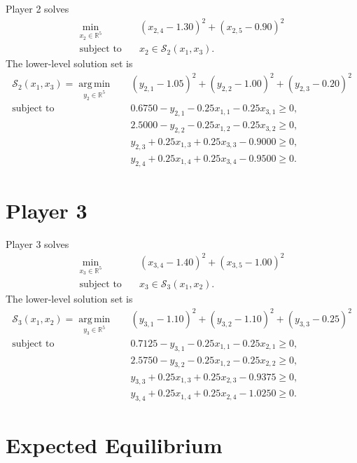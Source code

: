 \documentclass[11pt]{article}
\begin{document}
Player 2 solves
\[
\begin{aligned}
  \min_{x_2 \in \mathbb{R}^5}
  \quad &
    (x_{2,4}-1.30)^2 + (x_{2,5}-0.90)^2 \\
  \text{subject to}
  \quad &
    x_2 \in \mathcal{S}_2(x_1,x_3).
\end{aligned}
\]
The lower-level solution set is
\[
\begin{aligned}
  \mathcal{S}_2(x_1,x_3)
  =
  \operatorname*{arg\,min}_{y_2 \in \mathbb{R}^5}
  \quad &
    (y_{2,1}-1.05)^2
    +(y_{2,2}-1.00)^2
    +(y_{2,3}-0.20)^2\\
  \text{subject to}
  \quad &
    0.6750 - y_{2,1} - 0.25x_{1,1} - 0.25x_{3,1} \ge 0,\\
  &
    2.5000 - y_{2,2} - 0.25x_{1,2} - 0.25x_{3,2} \ge 0,\\
  &
    y_{2,3} + 0.25x_{1,3} + 0.25x_{3,3} - 0.9000 \ge 0,\\
  &
    y_{2,4} + 0.25x_{1,4} + 0.25x_{3,4} - 0.9500 \ge 0.
\end{aligned}
\]

\section*{Player 3}

Player 3 solves
\[
\begin{aligned}
  \min_{x_3 \in \mathbb{R}^5}
  \quad &
    (x_{3,4}-1.40)^2 + (x_{3,5}-1.00)^2 \\
  \text{subject to}
  \quad &
    x_3 \in \mathcal{S}_3(x_1,x_2).
\end{aligned}
\]
The lower-level solution set is
\[
\begin{aligned}
  \mathcal{S}_3(x_1,x_2)
  =
  \operatorname*{arg\,min}_{y_3 \in \mathbb{R}^5}
  \quad &
    (y_{3,1}-1.10)^2
    +(y_{3,2}-1.10)^2
    +(y_{3,3}-0.25)^2\\
  \text{subject to}
  \quad &
    0.7125 - y_{3,1} - 0.25x_{1,1} - 0.25x_{2,1} \ge 0,\\
  &
    2.5750 - y_{3,2} - 0.25x_{1,2} - 0.25x_{2,2} \ge 0,\\
  &
    y_{3,3} + 0.25x_{1,3} + 0.25x_{2,3} - 0.9375 \ge 0,\\
  &
    y_{3,4} + 0.25x_{1,4} + 0.25x_{2,4} - 1.0250 \ge 0.
\end{aligned}
\]

\section*{Expected Equilibrium}
\end{document}
